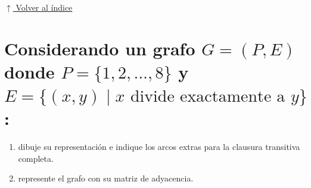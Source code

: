 \documentclass[12pt]{article}
\theoremstyle{definition}
\theoremstyle{remark}
\newcommand{\volverindice}{%
    \vspace{1em}%
    \begin{flushright}%
        \hyperlink{indice}{\small $\uparrow$ Volver al índice}%
    \end{flushright}%
}
\begin{document}
\volverindice
\newpage


\section[Grafo de divisibilidad]{Considerando un grafo $G = (P, E)$ donde $P = \{1, 2, \ldots, 8\}$ y $E = \{(x, y) \mid x \text{ divide exactamente a } y\}$:}

\begin{enumerate}[label=\alph*)]
\item dibuje su representación e indique los arcos extras para la clausura transitiva completa.

\item represente el grafo con su matriz de adyacencia.
\end{enumerate}
\end{document}
